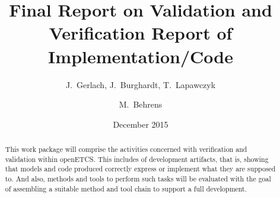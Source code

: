 \documentclass{template/openetcs_report}
\numberwithin{figure}{chapter}
\numberwithin{table}{chapter}
\begin{document}
\frontmatter
{}




\title{Final Report on Validation and Verification Report of Implementation/Code}


\date{December 2015}






\author{J.\ Gerlach, J.\ Burghardt, T.\ Lapawczyk}

\author{M.\ Behrens}



\sloppy %

\begin{abstract}
  This work package will comprise the activities concerned with
  verification and validation within openETCS. This includes \vv of
  development artifacts, that is, showing that models and code
  produced correctly express or implement what they are supposed
  to. And also, methods and tools to perform such tasks will be
  evaluated with the goal of assembling a suitable method and tool
  chain to support a full development.
\end{abstract}
\end{document}
